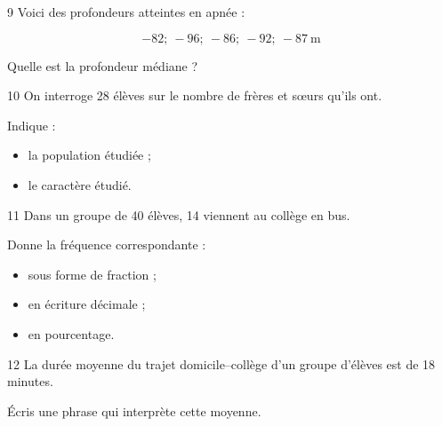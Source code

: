 \documentclass[9.5pt,a4paper,landscape]{article}
\begin{document}
\noindent
\begin{minipage}[t]{0.242\linewidth}
\begin{exo}{9}
Voici des profondeurs atteintes en apnée :

\[
-82;\ -96;\ -86;\ -92;\ -87\ \text{m}
\]

Quelle est la profondeur médiane ?
\end{exo}
\end{minipage}
\hfill
%
\begin{minipage}[t]{0.242\linewidth}
\begin{exo}{10}
On interroge 28 élèves sur le nombre de frères et sœurs qu'ils ont.

\medskip
Indique :
\begin{itemize}
  \item la population étudiée ;
  \item le caractère étudié.
\end{itemize}
\end{exo}
\end{minipage}
\hfill
%
\begin{minipage}[t]{0.242\linewidth}
\begin{exo}{11}
Dans un groupe de 40 élèves, 14 viennent au collège en bus.

\medskip
Donne la fréquence correspondante :
\begin{itemize}
  \item sous forme de fraction ;
  \item en écriture décimale ;
  \item en pourcentage.
\end{itemize}
\end{exo}
\end{minipage}
\hfill
%
\begin{minipage}[t]{0.242\linewidth}
\begin{exo}{12}
La durée moyenne du trajet domicile--collège d'un groupe d'élèves
est de 18 minutes.

\medskip
Écris une phrase qui interprète cette moyenne.
\end{exo}
\end{minipage}

%
%
\end{document}
